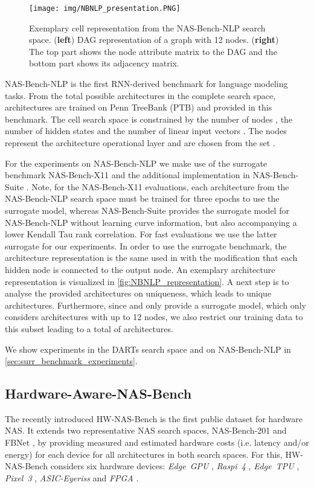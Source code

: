 \documentclass[runningheads]{llncs}
\begin{document}
\begin{figure*}
	\centering
	\texttt{[image: img/NBNLP\_presentation.PNG]}
	\caption{Exemplary cell representation from the NAS-Bench-NLP search space. (\textbf{left}) DAG representation of a graph with 12 nodes. (\textbf{right}) The top part shows the node attribute matrix to the DAG and the bottom part shows its adjacency matrix. \label{fig:NBNLP_representation}}
\end{figure*}
NAS-Bench-NLP \cite{2020NBNLP} is the first RNN-derived benchmark for language modeling tasks. From the total  possible architectures in the complete search space,  architectures are trained on Penn TreeBank \cite{2010PTB} (PTB) and provided in this benchmark. The cell search space is constrained by the number of nodes , the number of hidden states  and the number of linear input vectors .  The nodes represent the architecture operational layer and are chosen from the set .

For the experiments on NAS-Bench-NLP \cite{2020NBNLP} we make use of the surrogate benchmark NAS-Bench-X11 \cite{2021NBX11} and the additional  implementation in NAS-Bench-Suite \cite{NBSuite}. Note, for the NAS-Bench-X11 evaluations, each architecture from the NAS-Bench-NLP search space must be trained for three epochs to use the surrogate model, whereas NAS-Bench-Suite provides the surrogate model for NAS-Bench-NLP without learning curve information, but also accompanying a lower Kendall Tau rank correlation. For fast evaluations we use the latter surrogate for our experiments. In order to use the surrogate benchmark, the architecture representation is the same used in  \cite{2021NBX11} with the modification that each hidden node is connected to the output node. An exemplary architecture representation is visualized in \autoref{fig:NBNLP_representation}. A next step is to analyse the  provided architectures on uniqueness, which leads to   unique architectures. Furthermore, since \cite{2021NBX11} and \cite{NBSuite} only provide a surrogate model, which only considers architectures with up to 12 nodes, we also restrict our training data to this subset leading to a total of  architectures. 

We show experiments in the DARTs search space and on NAS-Bench-NLP in \autoref{sec:surr_benchmark_experiments}.

\subsection{Hardware-Aware-NAS-Bench}
The recently introduced HW-NAS-Bench \cite{2021HWNNB} is the first public dataset for hardware NAS.
It extends two representative NAS search spaces, NAS-Bench-201 \cite{2020NB201} and FBNet \cite{2019FBNet}, by providing measured and estimated hardware costs (i.e. latency and/or energy) for each device for all architectures in both search spaces.
For this, HW-NAS-Bench considers six hardware devices:
\textit{Edge~GPU} \cite{edgegpu}, \textit{Raspi~4} \cite{rapsi4}, \textit{Edge~TPU} \cite{edgetpu}, \textit{Pixel~3} \cite{pixel3}, \textit{ASIC-Eyeriss} \cite{eyeriss} and \textit{FPGA} \cite{fpga_1,fpga_2}.
\end{document}
